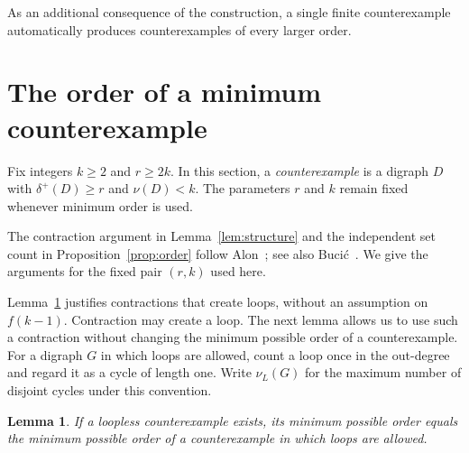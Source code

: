 \documentclass[10pt,a4paper]{article}
\newtheorem{lemma}[theorem]{Lemma}
\numberwithin{equation}{section}
\begin{document}
As an additional consequence of the construction, a single finite counterexample automatically produces counterexamples of every larger order. %


\section{The order of a minimum counterexample}\label{sec:order}


Fix integers $k\ge2$ and $r\ge2k$. In this section, a \textit{counterexample} is
a digraph $D$ with $\delta^+(D)\ge r$ and $\nu(D)<k$. The parameters
$r$ and $k$ remain fixed whenever minimum order is used.


The contraction argument in Lemma~\ref{lem:structure} and the
independent set count in Proposition~\ref{prop:order} follow
Alon~\cite[Claims~1 and~2]{alonJCTB68}; see also
Buci\'c~\cite[Propositions~3.1 and~3.2]{bucicDM341}.
We give the arguments for the fixed pair $(r,k)$ used here. 


Lemma~\ref{lem:loops} justifies contractions that create loops,
without an assumption on $f(k-1)$.
Contraction may create a loop. The next lemma allows us to use such a
contraction without changing the minimum possible order of a
counterexample. For a digraph $G$ in which loops are allowed, count a
loop once in the out-degree and regard it as a cycle of length one.
Write $\nu_L(G)$ for the maximum number of disjoint cycles under
this convention.



\begin{lemma}\label{lem:loops}
If a loopless counterexample exists, its minimum possible order equals
the minimum possible order of a counterexample in which loops are
allowed.
\end{lemma}
\end{document}
